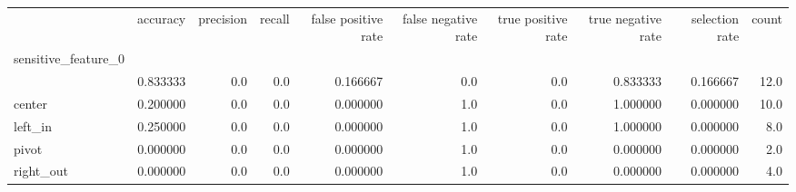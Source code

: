 \begin{tabular}{lrrrrrrrrr}
\toprule
{} &  accuracy &  precision &  recall &  false positive rate &  false negative rate &  true positive rate &  true negative rate &  selection rate &  count \\
sensitive\_feature\_0 &           &            &         &                      &                      &                     &                     &                 &        \\
\midrule
                    &  0.833333 &        0.0 &     0.0 &             0.166667 &                  0.0 &                 0.0 &            0.833333 &        0.166667 &   12.0 \\
center              &  0.200000 &        0.0 &     0.0 &             0.000000 &                  1.0 &                 0.0 &            1.000000 &        0.000000 &   10.0 \\
left\_in             &  0.250000 &        0.0 &     0.0 &             0.000000 &                  1.0 &                 0.0 &            1.000000 &        0.000000 &    8.0 \\
pivot               &  0.000000 &        0.0 &     0.0 &             0.000000 &                  1.0 &                 0.0 &            0.000000 &        0.000000 &    2.0 \\
right\_out           &  0.000000 &        0.0 &     0.0 &             0.000000 &                  1.0 &                 0.0 &            0.000000 &        0.000000 &    4.0 \\
\bottomrule
\end{tabular}
